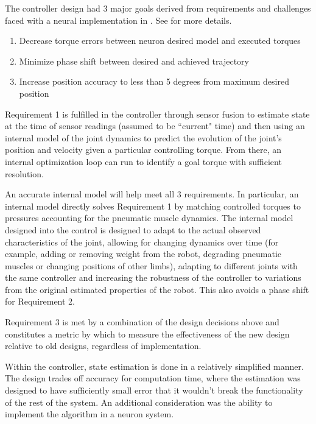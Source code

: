 The controller design had 3 major goals derived from
requirements and challenges faced with a neural implementation in
\cite{HuntPhDThesis}. See  for more details.

\begin{enumerate}
\item Decrease torque errors between neuron desired model and executed torques
\item Minimize phase shift between desired and achieved trajectory
\item Increase position accuracy to less than 5 degrees from maximum desired
position
\end{enumerate}

Requirement 1 is fulfilled in
the controller through sensor fusion to estimate state at the time of sensor
readings (assumed to be ``current" time) and then using an internal model of the
joint dynamics to predict the evolution of the joint's position and velocity
given a particular controlling torque. From there, an internal optimization loop
can run to identify a goal torque with sufficient resolution.

An accurate internal model will help meet all 3 requirements. In particular, an
internal model directly solves Requirement 1 by matching controlled torques to
pressures accounting for the pneumatic muscle dynamics. The internal model
designed into the control is designed to adapt to the actual observed
characteristics of the joint, allowing for changing dynamics over time (for
example, adding or removing weight from the robot, degrading pneumatic muscles
or changing positions of other limbs),
adapting to different joints with the same controller and increasing the
robustness of the controller to variations from the original estimated
properties of the robot. This also avoids a phase shift for Requirement 2. 

Requirement 3 is met by a combination of the design decisions above and
constitutes a metric by which to measure the effectiveness of the new design
relative to old designs, regardless of implementation.


Within the controller, state estimation is done in a relatively simplified
manner. The design trades off accuracy for computation time, where the 
estimation was designed to have sufficiently small error that it wouldn't 
break the functionality of the rest of the system. An additional consideration
was the ability to implement the algorithm in a neuron system.

